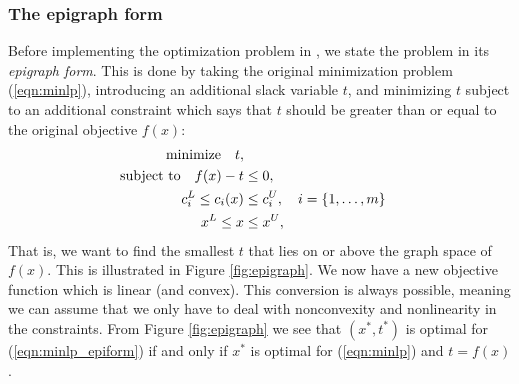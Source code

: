 \subsubsection{The epigraph form} \label{sec:epigraph}
Before implementing the optimization problem in \solvername, we state the problem in its \emph{epigraph form}. This is done by taking the original minimization problem (\ref{eqn:minlp}),  introducing an additional slack variable $t$, and minimizing $t$ subject to an additional constraint which says that $t$ should be greater than or equal to the original objective $f(x)$:
\begin{subequations} \label{eqn:minlp_epiform}
\begin{align}
\mathrm{minimize} \ \ \  t, \label{eqn:minlp_epiform_objective} \\
\mathrm{subject\ to} \ \ \  f(x) - t &\leq 0, \label{eqn:minlp_epiform_newconstr} \\
c_i^L \leq c_i(x) &\leq c_i^U,\ \ \ i = \lbrace 1, \dots, m \rbrace \label{eqn:minlp_epiform_constraints} \\
x^L \leq x &\leq x^U \label{eqn:minlp_epiform_varbounds},
\end{align}
\end{subequations}
That is, we want to find the smallest $t$ that lies on or above the graph space of $f(x)$. This is illustrated in Figure \ref{fig:epigraph}. We now have a new objective function which is linear (and convex). This conversion is always possible, meaning we can assume that we only have to deal with nonconvexity and nonlinearity in the constraints. From Figure \ref{fig:epigraph} we see that $(x^*, t^*)$ is optimal for (\ref{eqn:minlp_epiform}) if and only if $x^*$ is optimal for (\ref{eqn:minlp}) and $t = f(x)$. 
